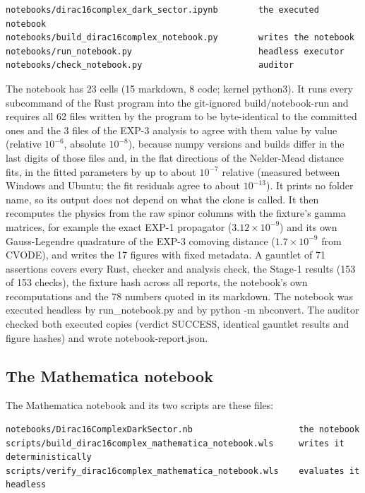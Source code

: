 \documentclass[11pt]{article}
\begin{document}
\begin{Verbatim}[fontsize=\small]
notebooks/dirac16complex_dark_sector.ipynb        the executed notebook
notebooks/build_dirac16complex_notebook.py        writes the notebook
notebooks/run_notebook.py                         headless executor
notebooks/check_notebook.py                       auditor
\end{Verbatim}

The notebook has 23 cells (15 markdown, 8 code; kernel python3). It runs every subcommand of the Rust program into the git-ignored build/notebook-run and requires all 62 files written by the program to be byte-identical to the committed ones and the 3 files of the EXP-3 analysis to agree with them value by value (relative $10^{-6}$, absolute $10^{-8}$), because numpy versions and builds differ in the last digits of those files and, in the flat directions of the Nelder-Mead distance fits, in the fitted parameters by up to about $10^{-7}$ relative (measured between Windows and Ubuntu; the fit residuals agree to about $10^{-13}$). It prints no folder name, so its output does not depend on what the clone is called. It then recomputes the physics from the raw spinor columns with the fixture's gamma matrices, for example the exact EXP-1 propagator ($3.12\times10^{-9}$) and its own Gauss-Legendre quadrature of the EXP-3 comoving distance ($1.7\times10^{-9}$ from CVODE), and writes the 17 figures with fixed metadata. A gauntlet of 71 assertions covers every Rust, checker and analysis check, the Stage-1 results (153 of 153 checks), the fixture hash across all reports, the notebook's own recomputations and the 78 numbers quoted in its markdown. The notebook was executed headless by run\_notebook.py and by python -m nbconvert. The auditor checked both executed copies (verdict SUCCESS, identical gauntlet results and figure hashes) and wrote notebook-report.json.

\subsection{The Mathematica notebook}

The Mathematica notebook and its two scripts are these files:

\begin{Verbatim}[fontsize=\small]
notebooks/Dirac16ComplexDarkSector.nb                     the notebook
scripts/build_dirac16complex_mathematica_notebook.wls     writes it deterministically
scripts/verify_dirac16complex_mathematica_notebook.wls    evaluates it headless
\end{Verbatim}
\end{document}
